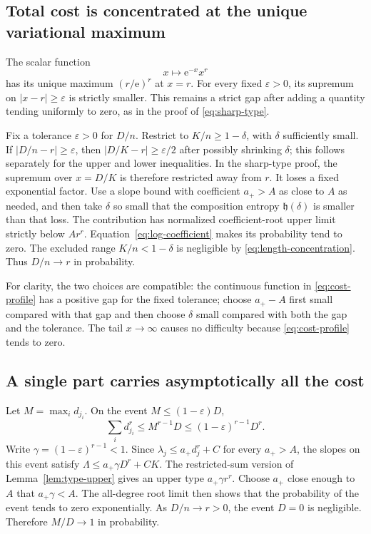 \documentclass[11pt,a4paper]{article}
\numberwithin{equation}{section}
\theoremstyle{definition}
\theoremstyle{remark}
\theoremstyle{definition}
\newcommand{\e}{\mathrm e}
\begin{document}
\subsection{Total cost is concentrated at the unique variational maximum}
The scalar function
\begin{equation}
 x\longmapsto \e^{-x}x^r
 \label{eq:cost-profile}
\end{equation}
has its unique maximum $(r/\e)^r$ at $x=r$. For every fixed
$\varepsilon>0$, its supremum on $|x-r|\ge\varepsilon$ is strictly
smaller. This remains a strict gap after adding a quantity tending
uniformly to zero, as in the proof of \eqref{eq:sharp-type}.

Fix a tolerance $\varepsilon>0$ for $D/n$. Restrict to
$K/n\ge1-\delta$, with $\delta$ sufficiently small. If
$|D/n-r|\ge\varepsilon$, then $|D/K-r|\ge\varepsilon/2$ after possibly
shrinking $\delta$; this follows separately for the upper and lower
inequalities. In the sharp-type proof, the supremum over $x=D/K$ is
therefore restricted away from $r$. It loses a fixed exponential factor.
Use a slope bound with coefficient $a_+>A$ as close to $A$ as needed,
and then take $\delta$ so small that the composition entropy
$\mathfrak h(\delta)$ is smaller than that loss. The contribution has
normalized coefficient-root upper limit strictly below $Ar^r$.
Equation~\eqref{eq:log-coefficient} makes its probability tend to zero.
The excluded range $K/n<1-\delta$ is negligible by
\eqref{eq:length-concentration}. Thus $D/n\to r$ in probability.

For clarity, the two choices are compatible: the continuous function
in \eqref{eq:cost-profile} has a positive gap for the fixed tolerance;
choose $a_+-A$ first small compared with that gap and then choose
$\delta$ small compared with both the gap and the tolerance. The tail
$x\to\infty$ causes no difficulty because \eqref{eq:cost-profile}
tends to zero.

\subsection{A single part carries asymptotically all the cost}
Let $M=\max_i d_{j_i}$. On the event $M\le(1-\varepsilon)D$,
\begin{equation}
 \sum_i d_{j_i}^r\le M^{r-1}D
                     \le(1-\varepsilon)^{r-1}D^r.
 \label{eq:strict-convexity-loss}
\end{equation}
Write $\gamma=(1-\varepsilon)^{r-1}<1$.
Since $\lambda_j\le a_+d_j^r+C$ for every $a_+>A$, the slopes on this
event satisfy $\Lambda\le a_+\gamma D^r+CK$.
The restricted-sum version of Lemma~\ref{lem:type-upper} gives an upper
type $a_+\gamma r^r$. Choose $a_+$ close enough to $A$ that
$a_+\gamma<A$. The all-degree root limit then shows that the probability
of the event tends to zero exponentially. As $D/n\to r>0$, the event
$D=0$ is negligible. Therefore $M/D\to1$ in probability.
\end{document}
